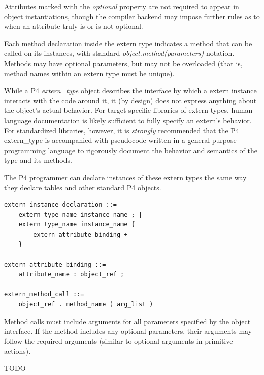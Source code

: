 \documentclass[12pt]{article}
\begin{document}
Attributes marked with the \textit{optional} property are not required to
appear in object instantiations, though the compiler backend may impose further
rules as to when an attribute truly is or is not optional.

Each method declaration inside the extern type indicates a method that can be
called on its instances, with standard \textit{object.method(parameters)} 
notation. Methods may have optional parameters, but may not be overloaded (that
is, method names within an extern type must be unique).

While a P4 \textit{extern_type} object describes the interface by which a
extern instance interacts with the code around it, it (by design) does not
express anything about the object's actual behavior. For target-specific
libraries of extern types, human language documentation is likely sufficient 
to fully specify an extern's behavior. For standardized libraries, however,
it is \textit{strongly} recommended that the P4 extern_type is accompanied
with pseudocode written in a general-purpose programming language to rigorously 
document the behavior and semantics of the type and its methods.


The P4 programmer can declare instances of these extern types the same way they
declare tables and other standard P4 objects.

\begin{lstlisting}[style=BNFstyle]
extern_instance_declaration ::= 
    extern type_name instance_name ; |
    extern type_name instance_name { 
        extern_attribute_binding +
    }

extern_attribute_binding ::=
    attribute_name : object_ref ;

extern_method_call ::= 
    object_ref . method_name ( arg_list )
\end{lstlisting}

Method calls must include arguments for all parameters specified by the
object interface. If the method includes any optional parameters, their
arguments may follow the required arguments (similar to optional arguments
in primitive actions).




TODO

\end{document}

